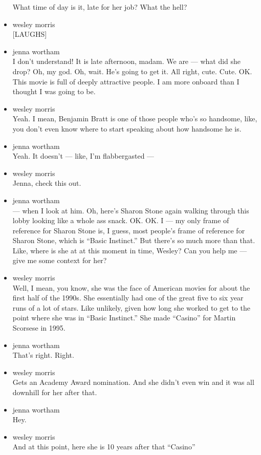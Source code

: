 \begin{itemize}
  What time of day is it, late for her job? What the hell?
\item
  wesley morris\\
  {[}LAUGHS{]}
\item
  jenna wortham\\
  I don't understand! It is late afternoon, madam. We are --- what did
  she drop? Oh, my god. Oh, wait. He's going to get it. All right, cute.
  Cute. OK. This movie is full of deeply attractive people. I am more
  onboard than I thought I was going to be.
\item
  wesley morris\\
  Yeah. I mean, Benjamin Bratt is one of those people who's so handsome,
  like, you don't even know where to start speaking about how handsome
  he is.
\item
  jenna wortham\\
  Yeah. It doesn't --- like, I'm flabbergasted ---
\item
  wesley morris\\
  Jenna, check this out.
\item
  jenna wortham\\
  --- when I look at him. Oh, here's Sharon Stone again walking through
  this lobby looking like a whole ass snack. OK. OK. I --- my only frame
  of reference for Sharon Stone is, I guess, most people's frame of
  reference for Sharon Stone, which is ``Basic Instinct.'' But there's
  so much more than that. Like, where is she at at this moment in time,
  Wesley? Can you help me --- give me some context for her?
\item
  wesley morris\\
  Well, I mean, you know, she was the face of American movies for about
  the first half of the 1990s. She essentially had one of the great five
  to six year runs of a lot of stars. Like unlikely, given how long she
  worked to get to the point where she was in ``Basic Instinct.'' She
  made ``Casino'' for Martin Scorsese in 1995.
\item
  jenna wortham\\
  That's right. Right.
\item
  wesley morris\\
  Gets an Academy Award nomination. And she didn't even win and it was
  all downhill for her after that.
\item
  jenna wortham\\
  Hey.
\item
  wesley morris\\
  And at this point, here she is 10 years after that ``Casino''

\end{itemize}
